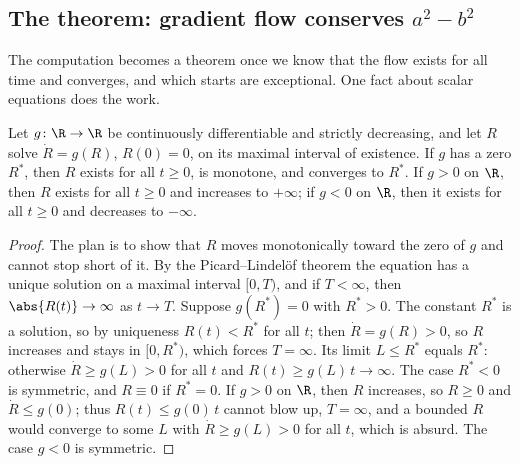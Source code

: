 \begin{refsection}
\section{The theorem: gradient flow conserves \texorpdfstring{$a^2-b^2$}{a2 - b2}}\label{sec:sgd:balance}

The computation becomes a theorem once we know that the flow exists for all time and converges, and which starts are exceptional. One fact about scalar equations does the work.

\begin{lemma}\label{lem:sgd:scalar}
Let $g\colon\R\to\R$ be continuously differentiable and strictly decreasing, and let $R$ solve $\dot R=g(R)$, $R(0)=0$, on its maximal interval of existence. If $g$ has a zero $R^*$, then $R$ exists for all $t\ge0$, is monotone, and converges to $R^*$. If $g>0$ on $\R$, then $R$ exists for all $t\ge0$ and increases to $+\infty$; if $g<0$ on $\R$, then it exists for all $t\ge0$ and decreases to $-\infty$.
\end{lemma}

\begin{proof}
The plan is to show that $R$ moves monotonically toward the zero of $g$ and cannot stop short of it. By the Picard--Lindel\"of theorem the equation has a unique solution on a maximal interval $[0,T)$, and if $T<\infty$, then $\abs{R(t)}\to\infty$ as $t\to T$. Suppose $g(R^*)=0$ with $R^*>0$. The constant $R^*$ is a solution, so by uniqueness $R(t)<R^*$ for all $t$; then $\dot R=g(R)>0$, so $R$ increases and stays in $[0,R^*)$, which forces $T=\infty$. Its limit $L\le R^*$ equals $R^*$: otherwise $\dot R\ge g(L)>0$ for all $t$ and $R(t)\ge g(L)\,t\to\infty$. The case $R^*<0$ is symmetric, and $R\equiv0$ if $R^*=0$. If $g>0$ on $\R$, then $R$ increases, so $R\ge0$ and $\dot R\le g(0)$; thus $R(t)\le g(0)\,t$ cannot blow up, $T=\infty$, and a bounded $R$ would converge to some $L$ with $\dot R\ge g(L)>0$ for all $t$, which is absurd. The case $g<0$ is symmetric.
\end{proof}


\end{refsection}
